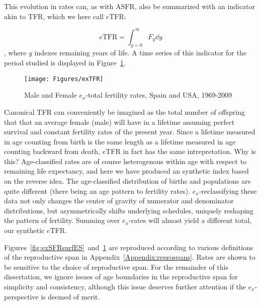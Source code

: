 This evolution in rates can, as with ASFR, also be
summarized with an indicator akin to TFR, which we here call $e$TFR:

\begin{equation}
\label{eq:exTFR}
e\mathrm{TFR} = \int _{y=0}^\infty F_y \dd y
\end{equation}
, where $y$ indexes remaining years of life. A time series of this indicator
for the period studied is displayed in Figure~\ref{fig:exTFR}.

\begin{figure}[ht!]
        \centering  
          \caption{Male and Female $e_x$-total fertility rates, Spain
          and USA, 1969-2009}
           \texttt{[image: Figures/exTFR]}
          \label{fig:exTFR}
\end{figure}

Canonical TFR can conveniently be imagined as the total number of
offspring that that an average female (male) will have in a lifetime assuming
perfect survival and constant fertility rates of the present year.
Since a lifetime measured in age counting from birth is the same length as a
lifetime measured in age counting backward from death, $e$TFR in fact has the
same intrepretation. Why is this? Age-classified rates are of course
heterogenous within age with respect to remaining life expectancy, and here we have produced
an synthetic index based on the reverse idea. The age-classified
distribution of births and populations are quite different (there being an age
pattern to fertility rates). $e_x$-reclassifying these data not only changes the
center of gravity of numerator and denominator distributions, but asymmetrically
shifts underlying schedules, uniquely reshaping the pattern of
fertility. Summing over $e_x$-rates will almost yield a different total, our
synthetic $e$TFR. 

Figures~\ref{fig:exSFRsurfES}~and~\ref{fig:exTFR} are reproduced according to
various definitions of the reproductive span in
Appendix~\ref{Appendix:reprospans}. Rates are shown to be sensitive to the
choice of reproductive span. For the remainder of this dissertation, we ignore
issues of age boundaries in the reproductive span for simplicity and
consistency, although this issue deserves further attention if the
$e_x$-perspective is deemed of merit.